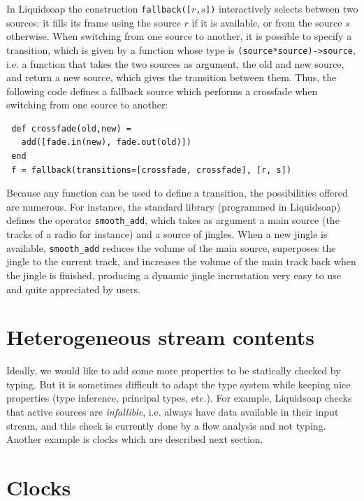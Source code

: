 \documentclass{llncs}
\newcommand{\liquidsoap}{Liquidsoap}
\newcommand{\ie}{{i.e.}}
\begin{document}
In \liquidsoap{} the construction \texttt{fallback([$r$,$s$])} interactively
selects between two sources: it fills its frame using the source \texttt{$r$} if
it is available, or from the source \texttt{$s$} otherwise.  When switching from
one source to another, it is possible to specify a transition, which is given by
a function whose type is \hbox{\texttt{(source*source)->source}}, \ie{} a
function that takes the two sources as argument, the old and new source, and
return a new source, which gives the transition between them. Thus, the
following code defines a fallback source which performs a crossfade when
switching from one source to another:
\begin{verbatim}
 def crossfade(old,new) =
   add([fade.in(new), fade.out(old)])
 end
 f = fallback(transitions=[crossfade, crossfade], [r, s])
\end{verbatim}

Because any function can be used to define a transition, the possibilities
offered are numerous. For instance, the standard library (programmed in
\liquidsoap{}) defines the operator \texttt{smooth\_add}, which takes as
argument a main source (the tracks of a radio for instance) and a source of
jingles. When a new jingle is available, \texttt{smooth\_add} reduces the volume
of the main source, superposes the jingle to the current track, and increases
the volume of the main track back when the jingle is finished, producing a
dynamic jingle incrustation very easy to use and quite appreciated by
users.

\section{Heterogeneous stream contents}
\label{sec:content}



Ideally, we would like to add some more properties to be statically checked by
typing. But it is sometimes difficult to adapt the type system while keeping
nice properties (type inference, principal types, etc.). For example,
\liquidsoap{} checks that active sources are \emph{infallible}, \ie{} always
have data available in their input stream, and this check is currently done by a
flow analysis and not typing. Another example is clocks which are described next
section.


\section{Clocks}
\label{sec:clocks}

\end{document}
